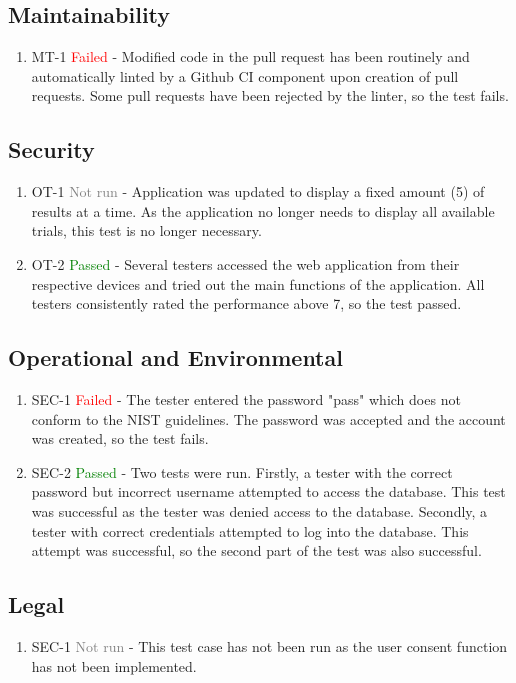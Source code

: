 \documentclass[12pt, titlepage]{article}
\begin{document}
\subsection{Maintainability}
\begin{enumerate}
  \item MT-1 \textcolor{red}{Failed} - Modified code in the pull request has been routinely and automatically linted by a Github CI component upon creation of pull requests. Some pull requests have been rejected by the linter, so the test fails.
\end{enumerate}

\subsection{Security}
\begin{enumerate}
  \item OT-1 \textcolor{gray}{Not run} - Application was updated to display a fixed amount (5) of results at a time. As the application no longer needs to display all available trials, this test is no longer necessary.  
\item OT-2 \textcolor{green}{Passed} - Several testers accessed the web application from their respective devices and tried out the main functions of the application. All testers consistently rated the performance above 7, so the test passed.
\end{enumerate}

\subsection{Operational and Environmental}
\begin{enumerate}
  \item SEC-1 \textcolor{red}{Failed} - The tester entered the password "pass" which does not conform to the NIST guidelines. The password was accepted and the account was created, so the test fails.
\item SEC-2 \textcolor{green}{Passed} - Two tests were run. Firstly, a tester with the correct password but incorrect username attempted to access the database. This test was successful as the tester was denied access to the database. Secondly, a tester with correct credentials attempted to log into the database. This attempt was successful, so the second part of the test was also successful.
\end{enumerate}

\subsection{Legal}
\begin{enumerate}
  \item SEC-1 \textcolor{gray}{Not run} - This test case has not been run as the user consent function has not been implemented.
\end{enumerate}
\end{document}
